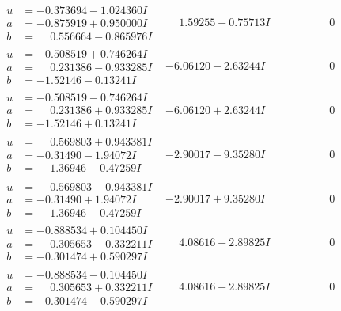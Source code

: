 \documentclass[1p]{elsarticle_modified}
\theoremstyle{definition}
\begin{document}
$$\begin{array}{c|c|c}
\begin{aligned}
u &= -0.373694 - 1.024360 I \\
a &= -0.875919 + 0.950000 I \\
b &= \phantom{-}0.556664 - 0.865976 I\end{aligned}
 & \phantom{-}1.59255 - 0.75713 I & \phantom{-0.000000 } 0 \\ \hline\begin{aligned}
u &= -0.508519 + 0.746264 I \\
a &= \phantom{-}0.231386 - 0.933285 I \\
b &= -1.52146 - 0.13241 I\end{aligned}
 & -6.06120 - 2.63244 I & \phantom{-0.000000 } 0 \\ \hline\begin{aligned}
u &= -0.508519 - 0.746264 I \\
a &= \phantom{-}0.231386 + 0.933285 I \\
b &= -1.52146 + 0.13241 I\end{aligned}
 & -6.06120 + 2.63244 I & \phantom{-0.000000 } 0 \\ \hline\begin{aligned}
u &= \phantom{-}0.569803 + 0.943381 I \\
a &= -0.31490 - 1.94072 I \\
b &= \phantom{-}1.36946 + 0.47259 I\end{aligned}
 & -2.90017 - 9.35280 I & \phantom{-0.000000 } 0 \\ \hline\begin{aligned}
u &= \phantom{-}0.569803 - 0.943381 I \\
a &= -0.31490 + 1.94072 I \\
b &= \phantom{-}1.36946 - 0.47259 I\end{aligned}
 & -2.90017 + 9.35280 I & \phantom{-0.000000 } 0 \\ \hline\begin{aligned}
u &= -0.888534 + 0.104450 I \\
a &= \phantom{-}0.305653 - 0.332211 I \\
b &= -0.301474 + 0.590297 I\end{aligned}
 & \phantom{-}4.08616 + 2.89825 I & \phantom{-0.000000 } 0 \\ \hline\begin{aligned}
u &= -0.888534 - 0.104450 I \\
a &= \phantom{-}0.305653 + 0.332211 I \\
b &= -0.301474 - 0.590297 I\end{aligned}
 & \phantom{-}4.08616 - 2.89825 I & \phantom{-0.000000 } 0 \\ \hline\begin{aligned}

\end{aligned}
\end{array}$$
\end{document}
